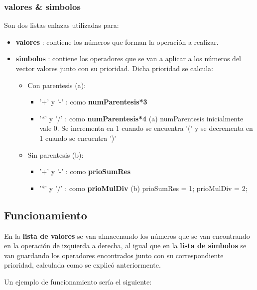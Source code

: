 \documentclass[12pt]{article}
\begin{document}
\subsubsection{valores \& simbolos}
Son dos listas enlazas utilizadas para:
\begin{itemize}
    \item \textbf{valores} : contiene los números que forman la operación a realizar.
    \item \textbf{simbolos} : contiene los operadores que se van a aplicar a los números del vector valores junto con su prioridad. Dicha prioridad se calcula:
    \begin{itemize}
        \item Con parentesis {\scriptsize(a)}:
        \begin{itemize}
            \item '+' y '-' : como \textbf{numParentesis*3}
            \item '*' y '/' : como \textbf{numParentesis*4} \newline
            {\scriptsize (a) numParentesis inicialmente vale 0. Se incrementa en 1 cuando se encuentra '(' y se decrementa en 1 cuando se encuentra ')'}
        \end{itemize}
        \item Sin parentesis {\scriptsize(b)}:
        \begin{itemize}
            \item '+' y '-' : como \textbf{prioSumRes}
            \item '*' y '/' : como \textbf{prioMulDiv}\newline
            {\scriptsize (b) prioSumRes = 1; prioMulDiv = 2;}
        \end{itemize}
    \end{itemize}
\end{itemize}

\subsection{Funcionamiento}
En la \textbf{lista de valores} se van almacenando los números que se van encontrando en la operación de izquierda a derecha, al igual que en
la \textbf{lista de simbolos} se van guardando los operadores encontrados junto con su correspondiente prioridad, calculada como se explicó anteriormente.

Un ejemplo de funcionamiento sería el siguiente:

\noindent{}%
\end{document}
